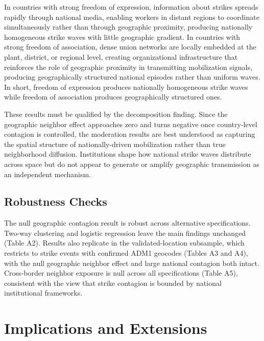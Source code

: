 \documentclass[
  11pt,
]{article}
\begin{document}
In countries with strong freedom of expression, information about
strikes spreads rapidly through national media, enabling workers in
distant regions to coordinate simultaneously rather than through
geographic proximity, producing nationally homogeneous strike waves with
little geographic gradient. In countries with strong freedom of
association, dense union networks are locally embedded at the plant,
district, or regional level, creating organizational infrastructure that
reinforces the role of geographic proximity in transmitting mobilization
signals, producing geographically structured national episodes rather
than uniform waves. In short, freedom of expression produces nationally
homogeneous strike waves while freedom of association produces
geographically structured ones.

These results must be qualified by the decomposition finding. Since the
geographic neighbor effect approaches zero and turns negative once
country-level contagion is controlled, the moderation results are best
understood as capturing the spatial structure of nationally-driven
mobilization rather than true neighborhood diffusion. Institutions shape
how national strike waves distribute across space but do not appear to
generate or amplify geographic transmission as an independent mechanism.

\subsection{Robustness Checks}\label{robustness-checks}

The null geographic contagion result is robust across alternative
specifications. Two-way clustering and logistic regression leave the
main findings unchanged (Table A2). Results also replicate in the
validated-location subsample, which restricts to strike events with
confirmed ADM1 geocodes (Tables A3 and A4), with the null geographic
neighbor effect and large national contagion both intact. Cross-border
neighbor exposure is null across all specifications (Table A5),
consistent with the view that strike contagion is bounded by national
institutional frameworks.

\section{Implications and Extensions}\label{implications-and-extensions}
\end{document}
